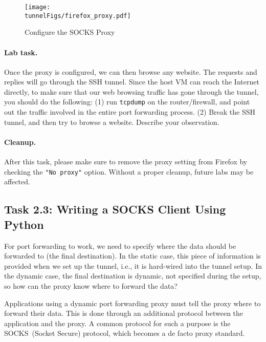 \begin{figure}[t]
\begin{center}
   \texttt{[image: \\tunnelFigs/firefox\_proxy.pdf]}
\end{center}
\caption{Configure the SOCKS Proxy}
\label{tunneling:fig:socks_config}
\end{figure}


\paragraph{Lab task.}
Once the proxy is configured, we can then browse any website. The
requests and replies will go through the SSH tunnel.
Since the host VM can reach the Internet directly, to make sure
that our web browsing traffic has gone through the tunnel, you should 
do the following: (1) run \texttt{tcpdump} on the router/firewall, and point out the 
traffic involved in the entire port forwarding process. 
(2) Break the SSH tunnel, and then try to browse a website. 
Describe your observation. 


\paragraph{Cleanup.} After this task, please make sure to 
remove the proxy setting from Firefox by 
checking the \texttt{"No proxy"} option. Without a proper cleanup,
future labs may be affected. 



\subsection{Task 2.3: Writing a SOCKS Client Using Python} 

For port forwarding to work, we need to specify where the data should be
forwarded to (the final destination). In the static case, this piece of information
is provided when we set up the tunnel, i.e., it is hard-wired into
the tunnel setup. In the dynamic case, the final destination
is dynamic, not specified during the setup, so
how can the proxy know where to forward the data?

Applications using a dynamic port forwarding proxy
must tell the proxy where to forward their data.
This is done through an additional protocol between the application
and the proxy. A common protocol for such a purpose is
the SOCKS~(Socket Secure) protocol, which becomes a de facto
proxy standard. 


